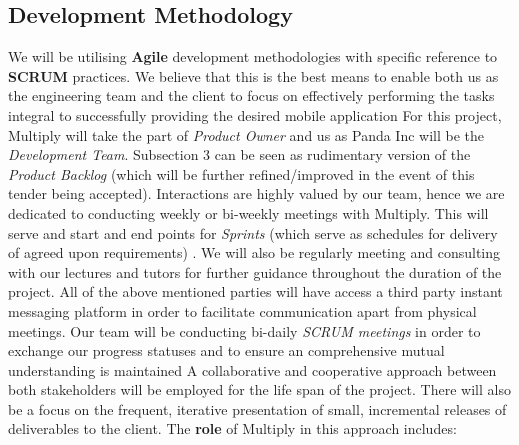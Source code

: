 \documentclass[11pt]{article}
\begin{document}
\subsection{Development Methodology}
We will be utilising \textbf{Agile} development methodologies with specific reference to \textbf{SCRUM} practices. We believe that this is the best means to enable both us as the engineering team and the client to focus on effectively performing the tasks integral to successfully providing the desired mobile application
For this project, Multiply will take the part of \emph{Product Owner} and us as Panda Inc will be the \emph{Development Team}. Subsection 3 can be seen as rudimentary version of the \emph{Product Backlog} (which will be further refined/improved in the event of this tender being accepted).
\newline \newline
Interactions are highly valued by our team, hence we are dedicated to conducting weekly or bi-weekly meetings with Multiply. This will serve and start and end points for \emph{Sprints} (which serve as schedules for delivery of agreed upon requirements) . We will also be regularly meeting and consulting with our lectures and tutors for further guidance throughout the duration of the project. All of the above mentioned parties will have access a third party instant messaging platform in order to facilitate communication apart from physical meetings. Our team will be conducting bi-daily \emph{SCRUM meetings} in order to exchange our progress statuses and to ensure an comprehensive mutual understanding is maintained
\newline \newline
A collaborative and cooperative approach between both stakeholders will be employed for the life span of the project. There will also be a focus on the frequent, iterative presentation of small, incremental releases of deliverables to the client. The \textbf{role} of Multiply in this approach includes:
\end{document}
